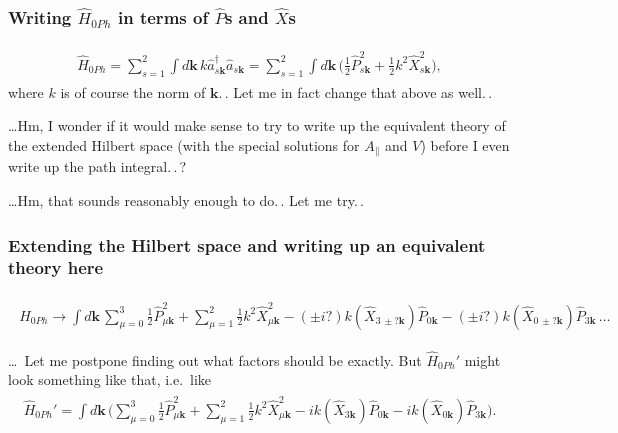 \documentclass{report}
\begin{document}

\subsubsection{Writing $\hat H_{0 Ph}$ in terms of $\hat P$s and $\hat X$s}
\begin{align}
\begin{aligned}
	\hat H_{0 Ph} = 
		\sum_{s=1}^2 \int d\boldsymbol{k}\, k
			\hat a^\dagger_{s \boldsymbol{k}} \hat a_{s \boldsymbol{k}} =
		\sum_{s=1}^2 \int d\boldsymbol{k}\, \big(
			\frac{1}{2} \hat P_{s \boldsymbol{k}}^2 + \frac{1}{2} k^2 \hat X_{s \boldsymbol{k}}^2
		\big),
	\label{H_0Ph(P,X)_01}
\end{aligned}
\end{align}
where $k$ is of course the norm of $\boldsymbol{k}$.\,. Let me in fact change that above as well.\,. 

\ldots Hm, I wonder if it would make sense to try to write up the equivalent theory of the extended Hilbert space (with the special solutions for $A_\parallel$ and $V$) before I even write up the path integral.\,.\,? 

\ldots Hm, that sounds reasonably enough to do.\,. Let me try.\,.


\subsubsection{Extending the Hilbert space and writing up an equivalent theory here}
\begin{align}
\begin{aligned}
	\hat H_{0 Ph} \to \int d\boldsymbol{k}\,
		\sum_{\mu=0}^3 \frac{1}{2} \hat P_{\mu \boldsymbol{k}}^2 +
		\sum_{\mu=1}^2 \frac{1}{2} k^2 \hat X_{\mu \boldsymbol{k}}^2 -
		(\pm i?) k (\hat X_{3\, \pm? \boldsymbol{k}}) \hat P_{0 \boldsymbol{k}} -
		(\pm i?) k (\hat X_{0\, \pm? \boldsymbol{k}}) \hat P_{3 \boldsymbol{k}}\,\ldots
\end{aligned}
\end{align}

\ldots\ Let me postpone finding out what factors should be exactly. But $\hat H_{0 Ph}'$ might look something like that, i.e.\ like
\begin{align}
\begin{aligned}
	\hat H_{0 Ph}' = \int d\boldsymbol{k}\, \Big(
		\sum_{\mu=0}^3 \frac{1}{2} \hat P_{\mu \boldsymbol{k}}^2 +
		\sum_{\mu=1}^2 \frac{1}{2} k^2 \hat X_{\mu \boldsymbol{k}}^2 -
		i k (\hat X_{3 \boldsymbol{k}}) \hat P_{0 \boldsymbol{k}} -
		i k (\hat X_{0\boldsymbol{k}}) \hat P_{3 \boldsymbol{k}}
	\Big).
	\label{H_Ph'_01}
\end{aligned}
\end{align}
\end{document}
